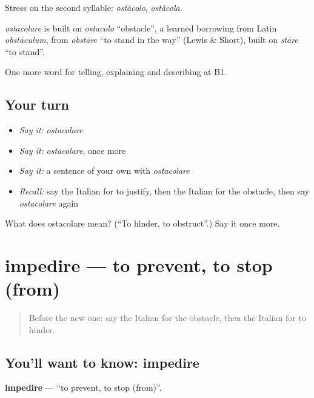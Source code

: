 Stress on the second syllable: \emph{ostàcolo}, \emph{ostàcola}.

\begin{cousinweb}
\emph{ostacolare} is built on \emph{ostacolo} \textquotedblleft{}obstacle\textquotedblright{}, a learned borrowing from Latin \emph{obstāculum}, from \emph{obstāre} \textquotedblleft{}to stand in the way\textquotedblright{} (Lewis \& Short), built on \emph{stāre} \textquotedblleft{}to stand\textquotedblright{}.
\end{cousinweb}

\begin{grammarlens}[title={What you've built}]
One more word for telling, explaining and describing at B1.
\end{grammarlens}

\subsection*{Your turn}
\begin{itemize}
\raggedright
  \item \emph{Say it:} \emph{ostacolare}
  \item \emph{Say it:} \emph{ostacolare}, once more
  \item \emph{Say it:} a sentence of your own with \emph{ostacolare}
  \item \emph{Recall:} say the Italian for to justify, then the Italian for the obstacle, then say \emph{ostacolare} again
\end{itemize}

\begin{tcolorbox}[breakable,colback=teal!4,colframe=teal!35!black,title={Before you move on}]
What does ostacolare mean? (\textquotedblleft{}To hinder, to obstruct\textquotedblright{}.) Say it once more.
\end{tcolorbox}
\section[impedire]{impedire — to prevent, to stop (from)}

\label{lesson:IT-C354-impedire}



\begin{quote}
Before the new one: say the Italian for the obstacle, then the Italian for to hinder.
\end{quote}

\subsection*{You'll want to know: impedire}
\textbf{impedire} — \textquotedblleft{}to prevent, to stop (from)\textquotedblright{}.

